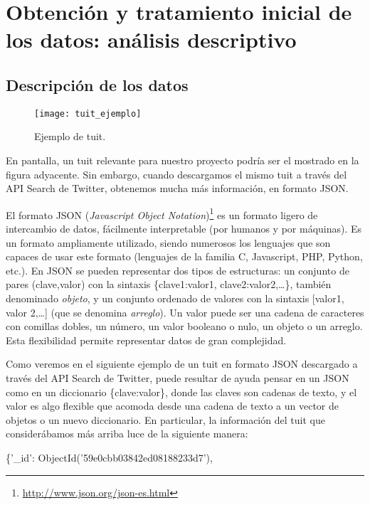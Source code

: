 \chapter{Obtención y tratamiento inicial de los datos: análisis descriptivo}
\label{chap:tratamiento_inicial_de_los_datos}

\section{Descripci\'on de los datos}


\begin{wrapfigure}[17]{R}{0.5\textwidth}
\texttt{[image: tuit\_ejemplo]}
\caption{Ejemplo de tuit.}\label{fig:tuit_ejemplo}
\end{wrapfigure} 


En pantalla, un tuit relevante para nuestro proyecto podría ser el 
mostrado en la figura ad\-ya\-cente. Sin embargo, cuando descargamos el mismo tuit a través del API Search de Twitter, 
obtenemos mucha más información, en formato JSON. 

El formato JSON ({\em Javascript Object Notation})\footnote{\url{http://www.json.org/json-es.html}} 
es un formato ligero de intercambio de datos, fácilmente interpretable (por humanos y por
máquinas). Es un formato ampliamente utilizado, siendo numerosos los
lenguajes que son capaces de usar este formato (lenguajes de la familia C, Javascript, PHP, Python, etc.). 
En JSON se pueden representar dos tipos
de estructuras: un conjunto de pares (clave,valor) con la sintaxis \{clave1:valor1, clave2:valor2,\dots\}, también
denominado {\em objeto}, y un conjunto ordenado de valores con la sintaxis [valor1, valor 2,\dots] (que se denomina {\em arreglo}). 
Un valor puede ser una cadena de caracteres con comillas dobles, un número, un valor booleano o nulo, 
un objeto o un arreglo. Esta flexibilidad permite representar datos de gran complejidad.

Como veremos en el siguiente ejemplo de un tuit en formato JSON descargado a través del API Search de Twitter,
puede resultar de ayuda pensar en un JSON como en un diccionario \{clave:valor\}, donde las claves
son cadenas de texto, y el valor es algo flexible que acomoda desde una cadena de texto a un vector de objetos 
o un nuevo diccionario. En particular, la información del tuit que considerábamos más arriba 
luce de la siguiente manera:

\bigskip


\{'\_id': ObjectId('59e0cbb03842ed08188233d7'),

